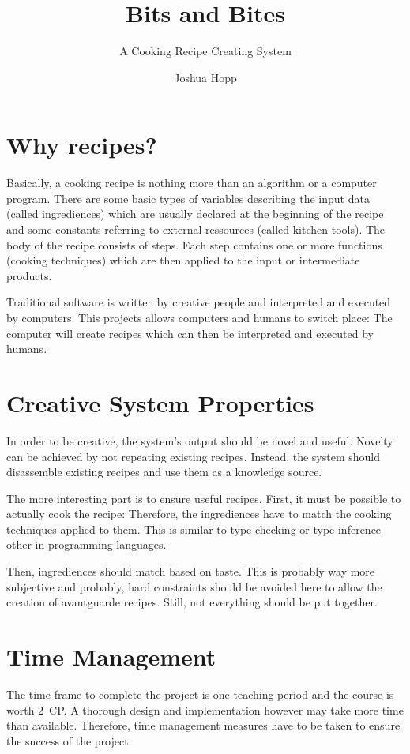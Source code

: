 \documentclass[a4paper,10pt]{scrartcl}
\title{Bits and Bites}
\subtitle{A Cooking Recipe Creating System}
\author{Joshua Hopp}
\begin{document}
\maketitle

\section{Why recipes?}
Basically, a cooking recipe is nothing more than an algorithm
or a computer program. There are some basic types of variables describing the input data (called ingrediences)
which are usually declared at the beginning of the recipe and some constants referring to external
ressources (called kitchen tools). The body of the recipe consists of steps. Each step contains one
or more functions (cooking techniques) which are then applied to the input or intermediate products.

Traditional software is written by creative people and interpreted and executed by computers. This projects
allows computers and humans to switch place: The computer will create recipes which can then be interpreted
and executed by humans. 

\section{Creative System Properties}
In order to be creative, the system's output should be novel and useful. Novelty can be achieved by not
repeating existing recipes. Instead, the system should disassemble existing recipes and use them as a
knowledge source. 

The more interesting part is to ensure useful recipes. First, it must be possible to actually cook 
the recipe: Therefore, the ingrediences have to match the cooking techniques applied to them. This
is similar to type checking or type inference other in programming languages.

Then, ingrediences should match based on taste. This is probably way more subjective and probably,
hard constraints should be avoided here to allow the creation of avantguarde recipes. Still, not
everything should be put together.

\section{Time Management}
The time frame to complete the project is one teaching period and the course is worth 2~CP. 
A thorough design and implementation however may take more time than available. Therefore,
time management measures have to be taken to ensure the success of the project.
\end{document}
